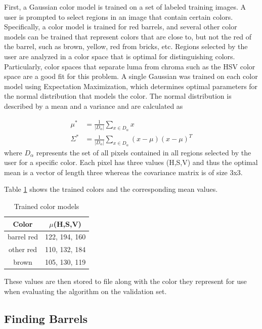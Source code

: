 \documentclass[letterpaper, 10 pt, conference]{ieeeconf}  %
\begin{document}
First, a Gaussian color model is trained on a set of labeled training images. A user is prompted to select regions in an image that contain certain colors. Specifically, a color model is trained for red barrels, and several other color models can be trained that represent colors that are close to, but not the red of the barrel, such as brown, yellow, red from bricks, etc. Regions selected by the user are analyzed in a color space that is optimal for distinguishing colors. Particularly, color spaces that separate luma from chroma such as the HSV color space are a good fit for this problem. A single Gaussian was trained on each color model using Expectation Maximization, which determines optimal parameters for the normal distribution that models the color. The normal distribution is described by a mean and a variance and are calculated as

\begin{align*}
\mu^* &= \frac{1}{|D_{\alpha}|} \sum_{x\in D_{\alpha}} x \\
\Sigma^* &= \frac{1}{|D_{\alpha}|} \sum_{x\in D_{\alpha}} (x-\mu)(x-\mu)^T
\end{align*}
where $D_{\alpha}$ represents the set of all pixels contained in all regions selected by the user for a specific color. Each pixel has three values (H,S,V) and thus the optimal mean is a vector of length three whereas the covariance matrix is of size 3x3.

Table \ref{mu} shows the trained colors and the corresponding mean values.
\begin{table}[h]
\caption{Trained color models}
\label{mu}
\begin{center}
\begin{tabular}{|c|c|}
\hline
Color & $\mu$(H,S,V)\\
\hline
barrel red & 122, 194, 160\\
\hline
other red & 110, 132, 184\\
\hline
brown & 105, 130, 119\\
\hline
\end{tabular}
\end{center}
\end{table}

These values are then stored to file along with the color they represent for use when evaluating the algorithm on the validation set.

\subsection{Finding Barrels}
\end{document}
